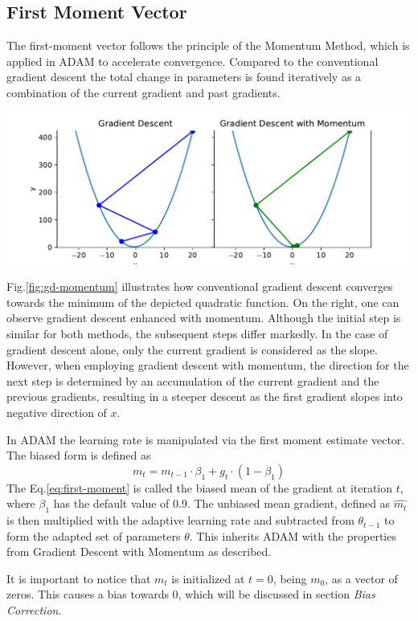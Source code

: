 \documentclass[oneside]{article}
\begin{document}
\subsection{First Moment Vector}
The first-moment vector follows the principle of the Momentum Method, which is applied in ADAM to accelerate convergence. Compared to the conventional gradient descent the total change in parameters is found iteratively as a combination of the current gradient and past gradients.\par
\begin{center}
    \includegraphics[width=1\textwidth]{report/figures/GD_momentum.pdf}
    \label{fig:gd-momentum}
\end{center}
Fig.\ref{fig:gd-momentum} illustrates how conventional gradient descent converges towards the minimum of the depicted quadratic function. On the right, one can observe gradient descent enhanced with momentum. Although the initial step is similar for both methods, the subsequent steps differ markedly. In the case of gradient descent alone, only the current gradient is considered as the slope. However, when employing gradient descent with momentum, the direction for the next step is determined by an accumulation of the current gradient and the previous gradients, resulting in a steeper descent as the first gradient slopes into negative direction of $x$.\par
In ADAM the learning rate is manipulated via the first moment estimate vector. The biased form is defined as 
\begin{equation}
    m_t=m_{t-1}\cdot \beta_1 + g_t\cdot (1-\beta_1)
    \label{eq:first-moment}
\end{equation}
The Eq.\ref{eq:first-moment} is called the biased mean of the gradient at iteration $t$, where $\beta_1$ has the default value of $0.9$. The unbiased mean gradient, defined as $\hat{m_t}$ is then multiplied with the adaptive learning rate and subtracted from $\theta_{t-1}$ to form the adapted set of parameters $\theta$. This inherits ADAM with the properties from Gradient Descent with Momentum as described.\par
It is important to notice that $m_t$ is initialized at $t=0$, being $m_0$, as a vector of zeros. This causes a bias towards $0$, which will be discussed in section \textit{Bias Correction}.
\end{document}
